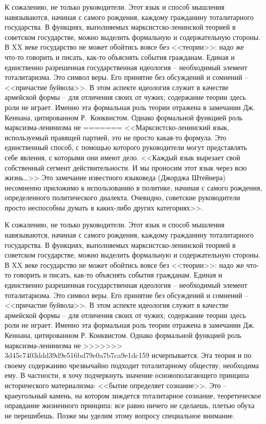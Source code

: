 \documentclass{book}
\begin{document}
К сожалению, не только руководители. Этот язык и способ мышления навязываются, начиная с самого рождения, каждому гражданину 
тоталитарного государства. В функциях, выполняемых марксистско‑ленинской теорией в советском государстве, можно выделить 
формальную и содержательную стороны. В XX веке государство не может обойтись вовсе без <<теории>>: надо же что‑то говорить и 
писать, как‑то объяснять события гражданам. Единая и единственно разрешенная государственная идеология -- необходимый элемент 
тоталитаризма. Это символ веры. Его принятие без обсуждений и сомнений -- <<причастие буйвола>>. В этом аспекте идеология служит в 
качестве армейской формы -- для отличения своих от чужих; содержание теории здесь роли не играет. Именно эта формальная роль 
теории отражена в замечании Дж. Кеннана, цитированном Р.~Конквистом. Однако формальной функцией роль марксизма‑ленинизма не 
=======
<<Марксистско-ленинский язык, используемый правящей пар­тией, это не просто какая-то формула. Это единственный спо­соб, с помощью 
которого руководители могут представлять себе явления, с которыми они имеют дело. <<Каждый язык вырезает свой собственный сегмент 
действительности. И мы проносим этот язык через всю жизнь\ldots>> Это замечание извест­ного языковеда (Джорджа Штейнера) 
несомненно приложимо к использованию в политике, начиная с самого рождения, опре­деленного политического диалекта. Очевидно, 
советские ру­ководители просто неспособны думать в каких-либо других категориях>>.

К сожалению, не только руководители. Этот язык и способ мышления навязываются, начиная с самого рождения, каждому гражданину 
тоталитарного государства. В функциях, выполняемых марксистско-ленинской теорией в советском государстве, можно выделить 
формальную и содержательную стороны. В XX веке государство не может обойтись вовсе без <<теории>>: надо же что-то говорить и 
писать, как-то объяснять события гражданам. Единая и единственно разрешенная государственная идеология -- необходимый элемент 
тоталитаризма. Это символ веры. Его принятие без обсуждений и сомнений -- <<причастие буйвола>>. В этом аспекте идеология служит в 
качестве армейской формы -- для отличения своих от чужих; содержание теории здесь роли не играет. Именно эта формальная роль 
теории отражена в замечании Дж. Кеннана, цитированном Р. Конквистом. Однако формальной функцией роль марксизма-ленинизма не 
>>>>>>> 3d45c7403ddd39d9e516bd79e0a7b7ca9e1dc159
исчерпывается. Эта теория и по своему содержанию чрезвычайно подходит тоталитарному обществу, необходима ему. В частности, я 
хочу подчеркнуть значение основополагающего прин­ципа исторического материализма: <<бытие определяет сознание>>. Это -- 
краеугольный камень, на котором зиждется тоталитарное сознание, теоретическое оправдание жизненного принципа: все равно ничего 
не сделаешь, плетью обуха не перешибешь. Позже мы уделим этому вопросу специальное внимание.
\end{document}

